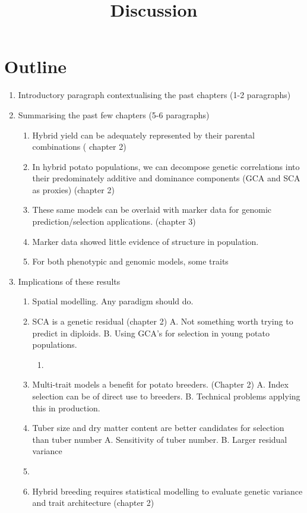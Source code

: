 \documentclass[
]{article}
\title{Discussion}
\author{}
\date{}
\providecommand{\tightlist}{%
  \setlength{\itemsep}{0pt}\setlength{\parskip}{0pt}}\usepackage{longtable,booktabs,array}
\begin{document}
\maketitle


\section{Outline}\label{outline}

\begin{enumerate}
\def\labelenumi{\arabic{enumi}.}
\item
  Introductory paragraph contextualising the past chapters (1-2
  paragraphs)
\item
  Summarising the past few chapters (5-6 paragraphs)

  \begin{enumerate}
  \def\labelenumii{\roman{enumii})}
  \tightlist
  \item
    Hybrid yield can be adequately represented by their parental
    combinations ( chapter 2)
  \item
    In hybrid potato populations, we can decompose genetic correlations
    into their predominately additive and dominance components (GCA and
    SCA as proxies) (chapter 2)
  \item
    These same models can be overlaid with marker data for genomic
    prediction/selection applications. (chapter 3)
  \item
    Marker data showed little evidence of structure in population.
  \item
    For both phenotypic and genomic models, some traits
  \end{enumerate}
\item
  Implications of these results

  \begin{enumerate}
  \def\labelenumii{\roman{enumii})}
  \tightlist
  \item
    Spatial modelling. Any paradigm should do.
  \item
    SCA is a genetic residual \autocite{Bernardo2016} (chapter 2) A. Not
    something worth trying to predict in diploids. B. Using GCA's for
    selection in young potato populations.

    \begin{enumerate}
    \def\labelenumiii{\Alph{enumiii}.}
    \setcounter{enumiii}{2}
    \tightlist
    \item
    \end{enumerate}
  \item
    Multi-trait models a benefit for potato breeders. (Chapter 2) A.
    Index selection can be of direct use to breeders. B. Technical
    problems applying this in production.
  \item
    Tuber size and dry matter content are better candidates for
    selection than tuber number A. Sensitivity of tuber number. B.
    Larger residual variance
  \item
  \item
    Hybrid breeding requires statistical modelling to evaluate genetic
    variance and trait architecture (chapter 2)


\end{enumerate}
\end{enumerate}
\end{document}
